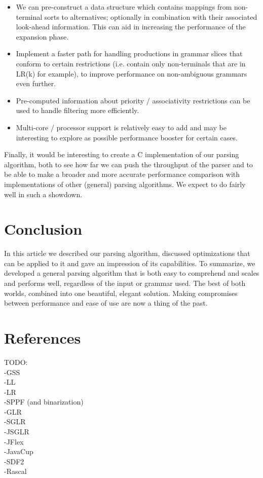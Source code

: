 \documentclass[a4paper,10pt]{article}
\begin{document}
\begin{itemize}
 \setlength{\itemsep}{0pt}
 \setlength{\parskip}{0pt}
 \setlength{\parsep}{0pt}
 
 \item We can pre-construct a data structure which contains mappings from non-terminal sorts to alternatives; optionally in combination with their associated look-ahead information. This can aid in increasing the performance of the expansion phase.
 \item Implement a faster path for handling productions in grammar slices that conform to certain restrictions (i.e. contain only non-terminals that are in LR(k) for example), to improve performance on non-ambiguous grammars even further.
 \item Pre-computed information about priority / associativity restrictions can be used to handle filtering more efficiently.
 \item Multi-core / processor support is relatively easy to add and may be interesting to explore as possible performance booster for certain cases.
\end{itemize}

Finally, it would be interesting to create a C implementation of our parsing algorithm, both to see how far we can push the throughput of the parser and to be able to make a broader and more accurate performance comparison with implementations of other (general) parsing algorithms. We expect to do fairly well in such a showdown.

\section{Conclusion}

In this article we described our parsing algorithm, discussed optimizations that can be applied to it and gave an impression of its capabilities. To summarize, we developed a general parsing algorithm that is both easy to comprehend and scales and performs well, regardless of the input or grammar used. The best of both worlds, combined into one beautiful, elegant solution. Making compromises between performance and ease of use are now a thing of the past.

\section{References}

TODO:\\
-GSS\\
-LL\\
-LR\\
-SPPF (and binarization)\\
-GLR\\
-SGLR\\
-JSGLR\\
-JFlex\\
-JavaCup\\
-SDF2\\
-Rascal
\end{document}
